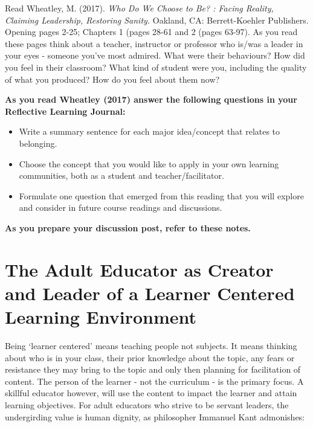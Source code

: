 \documentclass[
]{book}
\providecommand{\tightlist}{%
  \setlength{\itemsep}{0pt}\setlength{\parskip}{0pt}}
\begin{document}
\begin{reflect}
Read Wheatley, M. (2017). \emph{Who Do We Choose to Be? : Facing Reality, Claiming Leadership, Restoring Sanity.} Oakland, CA: Berrett-Koehler Publishers. Opening pages 2-25; Chapters 1 (pages 28-61 and 2 (pages 63-97). As you read these pages think about a teacher, instructor or professor who is/was a leader in your eyes - someone you've most admired. What were their behaviours? How did you feel in their classroom? What kind of student were you, including the quality of what you produced? How do you feel about them now?

\textbf{As you read Wheatley (2017) answer the following questions in your Reflective Learning Journal:}

\begin{itemize}
\tightlist
\item
  Write a summary sentence for each major idea/concept that relates to belonging.\\
\item
  Choose the concept that you would like to apply in your own learning communities, both as a student and teacher/facilitator.\\
\item
  Formulate one question that emerged from this reading that you will explore and consider in future course readings and discussions.
\end{itemize}

\textbf{As you prepare your discussion post, refer to these notes.}
\end{reflect}

\hypertarget{the-adult-educator-as-creator-and-leader-of-a-learner-centered-learning-environment}{%
\section{The Adult Educator as Creator and Leader of a Learner Centered Learning Environment}\label{the-adult-educator-as-creator-and-leader-of-a-learner-centered-learning-environment}}

Being `learner centered' means teaching people not subjects. It means thinking about who is in your class, their prior knowledge about the topic, any fears or resistance they may bring to the topic and only then planning for facilitation of content. The person of the learner - not the curriculum - is the primary focus. A skillful educator however, will use the content to impact the learner and attain learning objectives. For adult educators who strive to be servant leaders, the undergirding value is human dignity, as philosopher Immanuel Kant admonishes:
\end{document}
